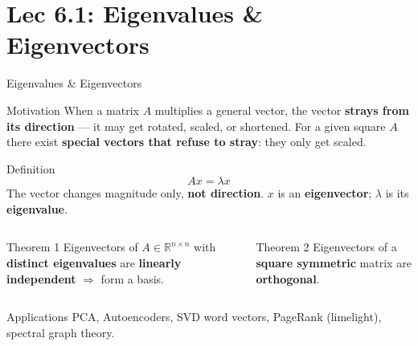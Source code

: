 \documentclass{beamer}
\begin{document}
\section{Lec 6.1: Eigenvalues \& Eigenvectors}

\begin{frame}[shrink=10]{Eigenvalues \& Eigenvectors}
  \begin{block}{Motivation}
    When a matrix $A$ multiplies a general vector, the vector
    \textbf{strays from its direction} --- it may get rotated, scaled,
    or shortened.
    For a given square $A$ there exist \textbf{special vectors that
    refuse to stray}: they only get scaled.
  \end{block}

  \medskip

  \begin{block}{Definition}
    \[
      Ax = \lambda x
    \]
    The vector changes magnitude only, \textbf{not direction}.
    $x$ is an \textbf{eigenvector}; $\lambda$ is its
    \textbf{eigenvalue}.
  \end{block}

  \medskip

  \begin{columns}[T]
    \begin{block}{Theorem 1}
      Eigenvectors of $A\in\mathbb{R}^{n\times n}$ with
      \textbf{distinct eigenvalues} are
      \textbf{linearly independent} $\Rightarrow$ form a basis.
    \end{block}

    \begin{block}{Theorem 2}
      Eigenvectors of a \textbf{square symmetric} matrix are
      \textbf{orthogonal}.
    \end{block}
  \end{columns}

  \medskip

  \begin{exampleblock}{Applications}
    PCA, Autoencoders, SVD word vectors, PageRank (limelight),
    spectral graph theory.
  \end{exampleblock}
\end{frame}
\end{document}
